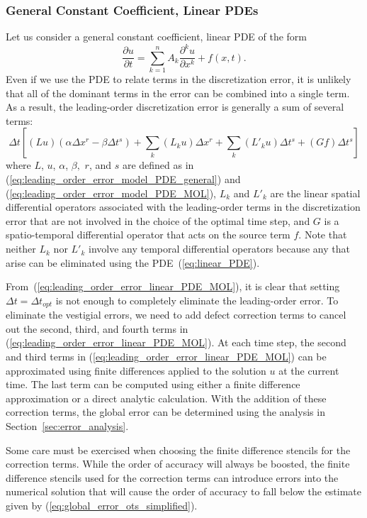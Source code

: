\documentclass[fleqn,12pt,twoside]{article}
\newcommand{\beq}{\begin{equation}}
\newcommand{\eeq}{\end{equation}}
\def\dt{\Delta t}
\def\dx{\Delta x}
\def\dto{\dt_{opt}}
\begin{document}
\subsubsection*{\label{sec:ots_linear_pde} 
            General Constant Coefficient, Linear PDEs} 
Let us consider a general constant coefficient, linear PDE of the form
\beq
  \frac{\partial u}{\partial t} = 
  \sum_{k=1}^n A_k \frac{\partial^k u}{\partial x^k} + f(x,t)
  \label{eq:linear_PDE}.
\eeq
Even if we use the PDE to relate terms in the discretization error, it is
unlikely that all of the dominant terms in the error can be combined into 
a single term.   As a result, the leading-order discretization error is
generally a sum of several terms:
\beq
  \dt\left[ (L u) (\alpha \dx^r - \beta \dt^s) 
  + \sum_k (L_k u) \dx^r 
  + \sum_k (L'_k u) \dt^s 
  + (G f) \dt^s \right]
  \label{eq:leading_order_error_linear_PDE_MOL}
\eeq
where $L$, $u$, $\alpha$, $\beta,$ $r$, and $s$ are defined as in
(\ref{eq:leading_order_error_model_PDE_general}) and
(\ref{eq:leading_order_error_model_PDE_MOL}), 
$L_k$ and $L'_k$ are the linear spatial differential operators associated 
with the leading-order terms in the discretization error that are not involved 
in the choice of the optimal time step, and $G$ is a spatio-temporal 
differential operator that acts on the source term $f$.  
Note that neither $L_k$ nor $L'_k$ involve any temporal differential 
operators because any that arise can be eliminated using the 
PDE~(\ref{eq:linear_PDE}).  

From~(\ref{eq:leading_order_error_linear_PDE_MOL}), it is clear that setting 
$\dt = \dto$ is not enough to completely eliminate the 
leading-order error.  To eliminate the vestigial errors, we need to add 
defect correction terms to cancel out the second, third, and fourth terms in 
(\ref{eq:leading_order_error_linear_PDE_MOL}).  At each time step, the second 
and third terms in (\ref{eq:leading_order_error_linear_PDE_MOL}) can be 
approximated using finite differences applied to the solution $u$ at the 
current time.
The last term can be computed using either a finite difference approximation 
or a direct analytic calculation.  With the addition of these correction 
terms, the global error can be determined using the analysis in 
Section~\ref{sec:error_analysis}.

Some care must be exercised when choosing the finite difference 
stencils for the correction terms.  While the order of accuracy will always
be boosted, the finite difference stencils used for the correction terms
can introduce errors into the numerical solution that will cause the order
of accuracy to fall below the estimate given by 
(\ref{eq:global_error_ots_simplified}).
\end{document}
